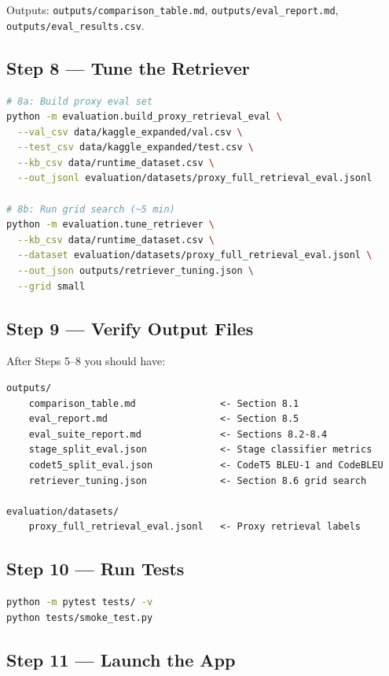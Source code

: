 \documentclass[12pt,a4paper]{article}
\begin{document}
Outputs: \texttt{outputs/comparison\_table.md}, \texttt{outputs/eval\_report.md}, \texttt{outputs/eval\_results.csv}.

\subsection{Step 8 --- Tune the Retriever}

\begin{lstlisting}[language=bash]
# 8a: Build proxy eval set
python -m evaluation.build_proxy_retrieval_eval \
  --val_csv data/kaggle_expanded/val.csv \
  --test_csv data/kaggle_expanded/test.csv \
  --kb_csv data/runtime_dataset.csv \
  --out_jsonl evaluation/datasets/proxy_full_retrieval_eval.jsonl

# 8b: Run grid search (~5 min)
python -m evaluation.tune_retriever \
  --kb_csv data/runtime_dataset.csv \
  --dataset evaluation/datasets/proxy_full_retrieval_eval.jsonl \
  --out_json outputs/retriever_tuning.json \
  --grid small
\end{lstlisting}

\subsection{Step 9 --- Verify Output Files}

After Steps 5--8 you should have:

\begin{lstlisting}[language={}]
outputs/
    comparison_table.md               <- Section 8.1
    eval_report.md                    <- Section 8.5
    eval_suite_report.md              <- Sections 8.2-8.4
    stage_split_eval.json             <- Stage classifier metrics
    codet5_split_eval.json            <- CodeT5 BLEU-1 and CodeBLEU
    retriever_tuning.json             <- Section 8.6 grid search

evaluation/datasets/
    proxy_full_retrieval_eval.jsonl   <- Proxy retrieval labels
\end{lstlisting}

\subsection{Step 10 --- Run Tests}

\begin{lstlisting}[language=bash]
python -m pytest tests/ -v
python tests/smoke_test.py
\end{lstlisting}

\subsection{Step 11 --- Launch the App}
\end{document}
